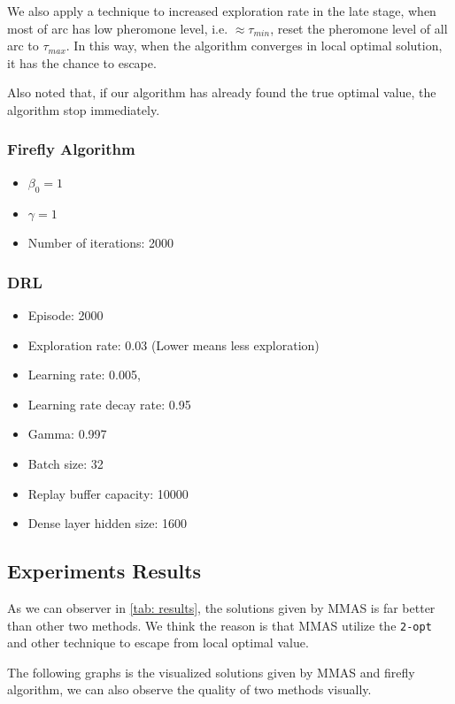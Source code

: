 \documentclass[twocolumn, a4paper]{extarticle}
\begin{document}
We also apply a technique to increased exploration rate in the late stage, when most of arc has low pheromone level, i.e. $\approx \tau_{min}$, reset the pheromone level of all arc to $\tau_{max}$. In this way, when the algorithm converges in local optimal solution, it has the chance to escape.

Also noted that, if our algorithm has already found the true optimal value, the algorithm stop immediately.

\subsubsection{Firefly Algorithm}

\begin{itemize}
	\item $\beta_0=1$
	\item $\gamma=1$
	\item Number of iterations: 2000
\end{itemize}


\subsubsection{DRL}

\begin{itemize}
	\item Episode: 2000
	\item Exploration rate: 0.03 (Lower means less exploration)
	\item Learning rate: 0.005,
	\item Learning rate decay rate: 0.95
	\item Gamma: 0.997
	\item Batch size: 32
	\item Replay buffer capacity: 10000
	\item Dense layer hidden size: 1600
\end{itemize}


\subsection{Experiments Results}

As we can observer in \autoref{tab: results}, the solutions given by MMAS is far better than other two methods. We think the reason is that MMAS utilize the \texttt{2-opt} and other technique to escape from local optimal value.

The following graphs is the visualized solutions given by MMAS and firefly algorithm, we can also observe the quality of two methods visually.
\end{document}

